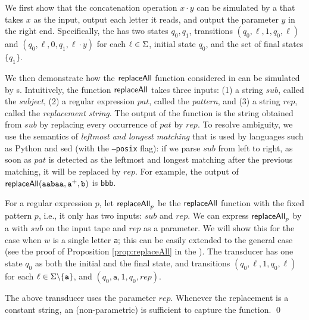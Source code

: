 \begin{example}
 We first show that the concatenation operation $x \cdot y$ can be simulated by a \PT{} that takes $x$ as the input, output each letter it reads, and output the parameter $y$ in the right end. Specifically, the \PT{} has two states $q_0, q_1$, transitions $(q_0, \ell, 1, q_0, \ell)$ and $(q_0, \ell, 0, q_1, \ell \cdot y)$ for each $\ell \in \Sigma$,  initial state $q_0$, and the set of final states $\{q_1\}$. 
 
  We then demonstrate how the  $\mathsf{replaceAll}$ function considered in \cite{CCHLW18} can be simulated by \PT{}s. 
  Intuitively,  
    the function $\mathsf{replaceAll}$ takes three inputs:
    (1) a string $sub$, called the \emph{subject}, (2) a regular expression
    $pat$, called the \emph{pattern}, and (3) a string $rep$, called
    the \emph{replacement string}. The output of the function is
    the string obtained from $sub$ by replacing every occurrence of $pat$ 
    by $rep$. To resolve ambiguity, we use the semantics of \emph{leftmost
    and longest matching} that is used by languages such as Python and sed (with the
    \texttt{--posix} flag): if we parse $sub$ from left to right, as soon as 
    $pat$ is detected as the leftmost and longest matching after the previous matching, it will be replaced by $rep$. For example, the
    output of $\mathsf{replaceAll}(\texttt{aabaa},\texttt{a}^+,\texttt{b})$ is
    \texttt{bbb}.

    For a regular expression $p$, let $\mathsf{replaceAll}_{p}$ be the $\mathsf{replaceAll}$ function with the fixed pattern $p$,
    i.e., it only has two inputs: $sub$ and $rep$. We can express
    $\mathsf{replaceAll}_{p}$ by a \PT{} with $sub$ on the input
    tape and $rep$ as a parameter. We will show this for the case when $w$ is 
    a single letter \texttt{a}; this can be easily extended to the general case 
    (see the proof of Proposition \ref{prop:replaceAll} in the 
    ). The transducer has one state $q_0$ as both the initial and the final state,
    and transitions 
    $(q_0,\ell, 1, q_0, \ell)$ for each $\ell \in \Sigma \backslash
    \{\texttt{a}\}$, 
    and $(q_0, \texttt{a}, 1, q_0, rep)$.

    The above transducer uses the parameter $rep$. Whenever the replacement
    is a constant string, an (non-parametric) \FT{} is sufficient to
    capture the function. \qed
\end{example}

